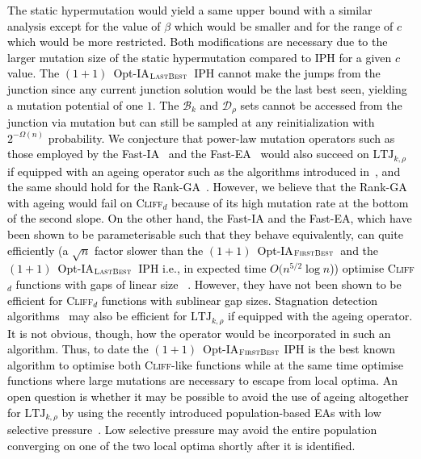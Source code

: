 \documentclass[lettersize,journal]{IEEEtran}
\newcommand{\rerev}[1]{\textcolor{black}{#1}}
\newcommand{\firstBest}{$(1+1)$~Opt-IA$_{\textsc{FirstBest}}$}
\newcommand{\lastBest}{$(1+1)$~Opt-IA$_{\textsc{LastBest}}$}
\begin{document}
\textcolor{black}{The static hypermutation would yield a same upper bound with a similar analysis except for the value of $\beta$ which would be smaller and for the range of $c$ which would be more restricted. Both modifications are necessary due to the larger mutation size of the static hypermutation compared to IPH for a given $c$ value. The \lastBest~IPH cannot make the jumps from the junction since any current junction solution would be the last best seen, yielding a mutation potential of one $1$. \rerev{The} $\mathcal{B}_k$ and $\mathcal{D}_\rho$ sets cannot be accessed from the junction via mutation but can still be sampled at any reinitialization with $2^{-\Omega(n)}$ probability.}
\textcolor{black}{We conjecture that power-law mutation operators such as those employed by the Fast-IA~\cite{CorusOlivetoYazdani2021TEVC} and the Fast-EA~\cite{DoerrGECCO2017FastGA} would also succeed on $\mathrm{LTJ}_{k,\rho}$ if equipped with an ageing operator such as the algorithms introduced in~\cite{CorusOlivetoYazdani2021TEVC}, and the same should hold for the Rank-GA~\cite{RankBasedMutation}. However, we believe that the Rank-GA with ageing would fail on \textsc{Cliff}$_d$ because of its high mutation rate at the bottom of the second slope. On the other hand, the Fast-IA and the Fast-EA, which have been shown to be parameterisable such that they behave equivalently, can quite efficiently (a $\sqrt{n}$ factor slower than the \firstBest~and the \lastBest~IPH i.e., in expected time $O(n^{5/2} \log n$))  optimise \textsc{Cliff}$_d$ functions with gaps of linear size~\cite{CorusOlivetoYazdani2021TEVC} . However, they have not been shown to be efficient for \textsc{Cliff}$_d$  functions with sublinear gap sizes. 
Stagnation detection algorithms~\cite{KW2024,RW2022,RW2023} may also be efficient for $\mathrm{LTJ}_{k,\rho}$ if equipped with the ageing operator. It is not obvious, though, how the operator would be incorporated in such an algorithm. Thus, to date the \firstBest{} IPH is the best known algorithm to optimise both \textsc{Cliff}-like functions while at the same time optimise functions where large mutations are necessary to escape from local optima. An open question is whether it may be possible to avoid the use of ageing altogether for $\mathrm{LTJ}_{k,\rho}$ by using the recently introduced population-based EAs with low selective pressure~\cite{CorusLissovoiOlivetoWittTELO2021,COZ25}. Low selective pressure may avoid the entire population converging on one of the two local optima shortly after it is identified.} 
 
\end{document}
